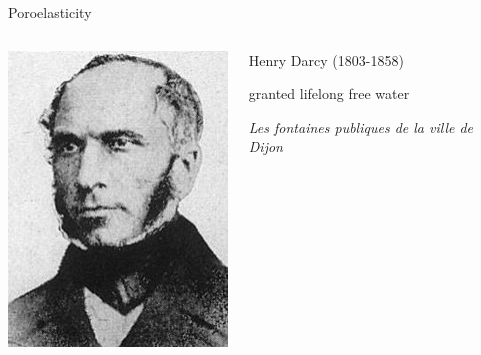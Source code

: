 \begin{frame}{Poroelasticity}
\begin{columns}
\includegraphics[width=\textwidth]{Henry_Darcy}
\begin{block}{Henry Darcy (1803-1858)}
\begin{description}[1803]
\item[1846] granted lifelong free water
\item[1856] \textit{Les fontaines publiques de la ville de Dijon}
\end{description}
\end{block}
\end{columns}


\end{frame}
